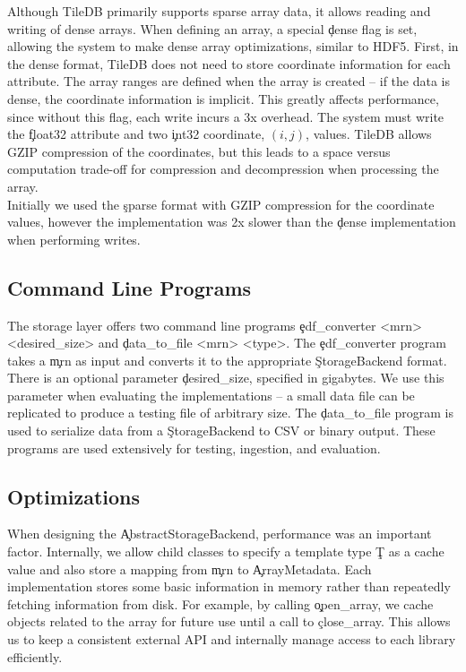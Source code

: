 Although TileDB primarily supports sparse array data, it allows reading and
writing of dense arrays. When defining an array, a special \c{dense} flag is
set, allowing the system to make dense array optimizations, similar to HDF5.
First, in the dense format, TileDB does not need to store coordinate
information for each attribute. The array ranges are defined when the array is
created -- if the data is dense, the coordinate information is implicit. This
greatly affects performance, since without this flag, each write incurs a 3x
overhead.  The system must write the \c{float32} attribute and two \c{int32}
coordinate, $(i,j)$, values. TileDB allows GZIP compression of the coordinates,
but this leads to a space versus computation trade-off for compression and
decompression when processing the array. \\

Initially we used the \c{sparse} format with GZIP compression for the
coordinate values, however the implementation was 2x slower than the \c{dense}
implementation when performing writes.

\subsection{Command Line Programs}\label{storage-ch:implementation-cmd}

The storage layer offers two command line programs \c{edf\_converter <mrn>
  <desired\_size>} and \c{data\_to\_file <mrn> <type>}. The \c{edf\_converter}
program takes a \c{mrn} as input and converts it to the appropriate
\c{StorageBackend} format. There is an optional parameter \c{desired\_size},
specified in gigabytes. We use this parameter when evaluating the
implementations -- a small data file can be replicated to produce a testing
file of arbitrary size. The \c{data\_to\_file} program is used to serialize
data from a \c{StorageBackend} to CSV or binary output. These programs are used
extensively for testing, ingestion, and evaluation.

\subsection{Optimizations}\label{storage-ch:opt}

When designing the \c{AbstractStorageBackend}, performance was an important
factor. Internally, we allow child classes to specify a template type \c{T} as
a cache value and also store a mapping from \c{mrn} to \c{ArrayMetadata}. Each
implementation stores some basic information in memory rather than repeatedly
fetching information from disk.  For example, by calling \c{open\_array}, we
cache objects related to the array for future use until a call to
\c{close\_array}. This allows us to keep a consistent external API and
internally manage access to each library efficiently.

